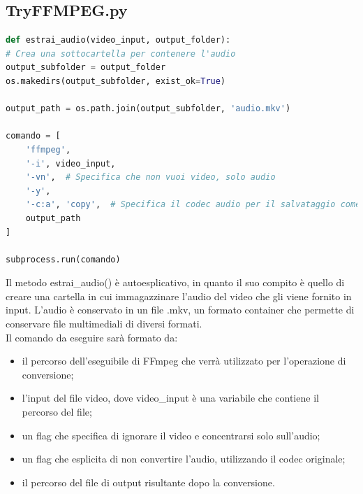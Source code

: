 \documentclass{report}
\begin{document}
\subsection{TryFFMPEG.py}
\begin{lstlisting}[language=Python, breaklines=true, frame=single]
def estrai_audio(video_input, output_folder):
# Crea una sottocartella per contenere l'audio
output_subfolder = output_folder
os.makedirs(output_subfolder, exist_ok=True)

output_path = os.path.join(output_subfolder, 'audio.mkv')

comando = [
    'ffmpeg',
    '-i', video_input,
    '-vn',  # Specifica che non vuoi video, solo audio
    '-y',
    '-c:a', 'copy',  # Specifica il codec audio per il salvataggio come MP3
    output_path
]

subprocess.run(comando)
\end{lstlisting}
Il metodo estrai\_audio() è autoesplicativo, in quanto il suo compito è quello di creare una cartella in cui immagazzinare l’audio del video che gli viene fornito in input. L’audio è conservato in un file .mkv, un formato container che permette di conservare file multimediali di diversi formati. \\
Il comando da eseguire sarà formato da:
\begin{itemize}
        \item
        il percorso dell'eseguibile di FFmpeg che verrà utilizzato per l'operazione di conversione;
        \item
        l’input del file video, dove video\_input è una variabile che contiene il percorso del file;
  \item
        un flag che specifica di ignorare il video e concentrarsi solo sull'audio;
  \item
        un flag che esplicita di non convertire l’audio, utilizzando il codec originale;
  \item
        il percorso del file di output risultante dopo la conversione.
\end{itemize}
\end{document}
